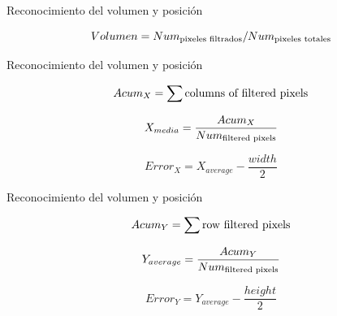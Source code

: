 \documentclass{beamer}
\begin{document}
\begin{frame}{Reconocimiento del volumen y posición}
\begin{alertblock}{}
		\begin{equation*} 
	Volumen = Num_{\textup{pixeles filtrados}}/Num_{\textup{pixeles totales}}
	\end{equation*}
\end{alertblock}
\end{frame}

\begin{frame}{Reconocimiento del volumen y posición}
\begin{alertblock}{}
		\begin{equation*}\label{equation:acumx}
	Acum_{X} = \sum\textup{columns of filtered pixels}
	\end{equation*}
	
	\begin{equation*}\label{equation:acumx2}
	X_{media} = \frac{Acum_{X}}{Num_{\textup{filtered pixels}}}
	\end{equation*}
	
	\begin{equation*}\label{equation:acumx3}
	Error_{X} = X_{average}- \frac{width}{2}
	\end{equation*}
\end{alertblock}
\end{frame}


\begin{frame}{Reconocimiento del volumen y posición}
\begin{alertblock}{}
	\begin{equation*}\label{equation:acumy}
	Acum_{Y} = \sum\textup{row filtered pixels}
	\end{equation*}

	\begin{equation*}\label{equation:acumy2}
	Y_{average} = \frac{Acum_{Y}}{Num_{\textup{filtered pixels}}}
	\end{equation*}

	\begin{equation*}\label{equation:acumy3}
	Error_{Y} = Y_{average}- \frac{height}{2}
	\end{equation*}
\end{alertblock}
\end{frame}
\end{document}
